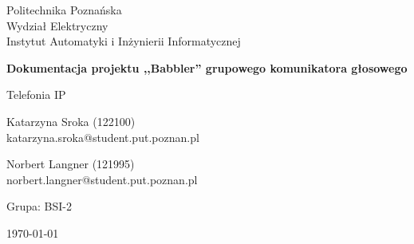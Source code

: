 \begin{titlepage}
	\centering
	{\Large Politechnika Poznańska\\
		Wydział Elektryczny\\
		Instytut Automatyki i Inżynierii Informatycznej\par}
	
	\vspace{2.5cm}
	{\LARGE\bfseries Dokumentacja projektu ,,Babbler''
		grupowego komunikatora głosowego}\\
		{\Large Telefonia IP\par}	
	\vspace{2.5cm}
	{\Large Katarzyna Sroka (122100)\\
		katarzyna.sroka@student.put.poznan.pl\par}
	\vspace{0.25cm}
	{\Large Norbert Langner (121995)\\
		norbert.langner@student.put.poznan.pl\par}
	\vspace{0.5cm}
	{Grupa: BSI-2}
	\vfill
	
	{\large \today\par}
\end{titlepage}